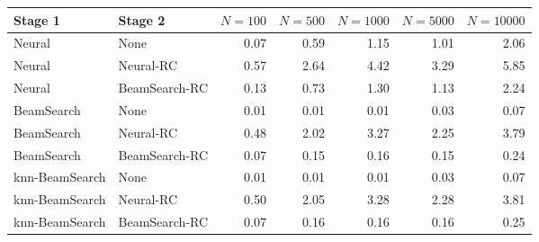 \begin{tabular}{llrrrrr}
\hline
Stage 1 & Stage 2 & $N=100$ & $N=500$ & $N=1000$ & $N=5000$ & $N=10000$ \\
\hline
Neural & None & 0.07 & 0.59 & 1.15 & 1.01 & 2.06 \\
Neural & Neural-RC & 0.57 & 2.64 & 4.42 & 3.29 & 5.85 \\
Neural & BeamSearch-RC & 0.13 & 0.73 & 1.30 & 1.13 & 2.24 \\
BeamSearch & None & 0.01 & 0.01 & 0.01 & 0.03 & 0.07 \\
BeamSearch & Neural-RC & 0.48 & 2.02 & 3.27 & 2.25 & 3.79 \\
BeamSearch & BeamSearch-RC & 0.07 & 0.15 & 0.16 & 0.15 & 0.24 \\
knn-BeamSearch & None & 0.01 & 0.01 & 0.01 & 0.03 & 0.07 \\
knn-BeamSearch & Neural-RC & 0.50 & 2.05 & 3.28 & 2.28 & 3.81 \\
knn-BeamSearch & BeamSearch-RC & 0.07 & 0.16 & 0.16 & 0.16 & 0.25 \\
\hline
\end{tabular}
